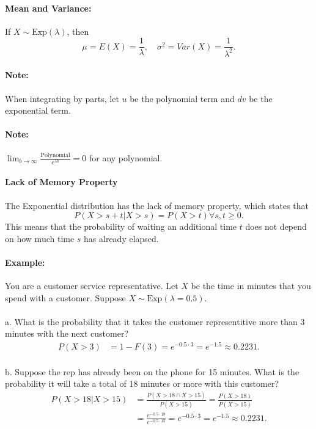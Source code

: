 \paragraph*{Mean and Variance:} If $X \sim \text{Exp}(\lambda)$, then
\[\mu = E(X) = \frac{1}{\lambda}, \quad \sigma^2 = Var(X) = \frac{1}{\lambda^2}.\]

\paragraph*{Note:} When integrating by parts, let $u$ be the polynomial term and $dv$ be the exponential term.
\paragraph*{Note:} $\lim_{b\to\infty} \frac{\text{Polynomial}}{e^{\lambda b}} = 0$ for any polynomial.

\paragraph*{Lack of Memory Property}
The Exponential distribution has the lack of memory property, which states that
\[P(X > s + t | X > s) = P(X > t) \forall s,t \geq 0.\]
This means that the probability of waiting an additional time $t$ does not depend on how much time $s$ has already elapsed.

\paragraph*{Example:}
You are a customer service representative. Let $X$ be the time in minutes that you spend with a customer.
Suppose $X \sim \text{Exp}(\lambda = 0.5)$.\\
\\
a. What is the probability that it takes the customer representitive more than 3 minutes with the next customer?
\begin{align*}
    P(X > 3) &= 1 - F(3) = e^{-0.5 \cdot 3} = e^{-1.5} \approx 0.2231.
\end{align*}\\

b. Suppose the rep has already been on the phone for 15 minutes. What is the probability it will take a total of 18 minutes 
or more with this customer?
\begin{align*}
    P(X > 18 | X > 15) &= \frac{P(X > 18 \cap X > 15)}{P(X > 15)} = \frac{P(X > 18)}{P(X > 15)} \\
    &= \frac{e^{-0.5 \cdot 18}}{e^{-0.5 \cdot 15}} = e^{-0.5 \cdot 3} = e^{-1.5} \approx 0.2231.
\end{align*}\\

